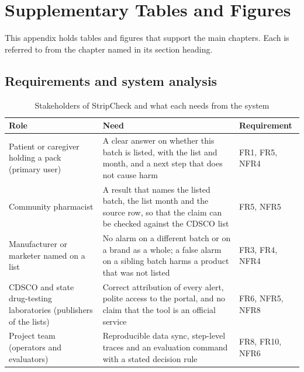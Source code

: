 \chapter{Supplementary Tables and Figures}
\label{app:supp}

This appendix holds tables and figures that support the main chapters. Each is referred to
from the chapter named in its section heading.

\section{Requirements and system analysis}

\begin{table}[H]
\centering
\caption{Stakeholders of StripCheck and what each needs from the system}
\label{tab:req-stakeholders}
\small\renewcommand{\_}{\textunderscore\allowbreak}
\begin{tabularx}{\linewidth}{@{}>{\raggedright\arraybackslash}p{3.3cm} >{\raggedright\arraybackslash}X >{\raggedright\arraybackslash}p{2.6cm}@{}}
\toprule
\textbf{Role} & \textbf{Need} & \textbf{Requirement} \\ \midrule
Patient or caregiver holding a pack (primary user) & A clear answer on whether this batch is listed, with the list and month, and a next step that does not cause harm & FR1, FR5, NFR4 \\
Community pharmacist & A result that names the listed batch, the list month and the source row, so that the claim can be checked against the CDSCO list & FR5, NFR5 \\
Manufacturer or marketer named on a list & No alarm on a different batch or on a brand as a whole; a false alarm on a sibling batch harms a product that was not listed & FR3, FR4, NFR4 \\
CDSCO and state drug-testing laboratories (publishers of the lists) & Correct attribution of every alert, polite access to the portal, and no claim that the tool is an official service & FR6, NFR5, NFR8 \\
Project team (operators and evaluators) & Reproducible data sync, step-level traces and an evaluation command with a stated decision rule & FR8, FR10, NFR6 \\
\bottomrule
\end{tabularx}
\end{table}

